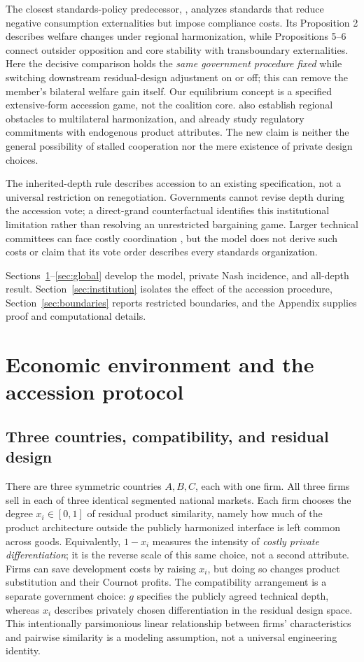 \documentclass[11pt,a4paper]{article}
\theoremstyle{remark}\newtheorem{remark}[theorem]{Remark}
\begin{document}
The closest standards-policy predecessor, \citet{Takarada2020}, analyzes standards that reduce negative consumption externalities but impose compliance costs. Its Proposition 2 describes welfare changes under regional harmonization, while Propositions 5--6 connect outsider opposition and core stability with transboundary externalities. Here the decisive comparison holds the \emph{same government procedure fixed} while switching downstream residual-design adjustment on or off; this can remove the member's bilateral welfare gain itself. Our equilibrium concept is a specified extensive-form accession game, not the coalition core. \citet{Kawabata2021} also establish regional obstacles to multilateral harmonization, and \citet{Grossman2021} already study regulatory commitments with endogenous product attributes. The new claim is neither the general possibility of stalled cooperation nor the mere existence of private design choices.

The inherited-depth rule describes accession to an existing specification, not a universal restriction on renegotiation. Governments cannot revise depth during the accession vote; a direct-grand counterfactual identifies this institutional limitation rather than resolving an unrestricted bargaining game. Larger technical committees can face costly coordination \citep{Simcoe2012}, but the model does not derive such costs or claim that its vote order describes every standards organization.

Sections~\ref{sec:model}--\ref{sec:global} develop the model, private Nash incidence, and all-depth result. Section~\ref{sec:institution} isolates the effect of the accession procedure, Section~\ref{sec:boundaries} reports restricted boundaries, and the Appendix supplies proof and computational details.

\section{Economic environment and the accession protocol}\label{sec:model}
\subsection{Three countries, compatibility, and residual design}
There are three symmetric countries $A,B,C$, each with one firm. All three firms sell in each of three identical segmented national markets. Each firm chooses the degree $x_i\in[0,1]$ of residual product similarity, namely how much of the product architecture outside the publicly harmonized interface is left common across goods. Equivalently, $1-x_i$ measures the intensity of \emph{costly private differentiation}; it is the reverse scale of this same choice, not a second attribute. Firms can save development costs by raising $x_i$, but doing so changes product substitution and their Cournot profits. The compatibility arrangement is a separate government choice: $g$ specifies the publicly agreed technical depth, whereas $x_i$ describes privately chosen differentiation in the residual design space. This intentionally parsimonious linear relationship between firms' characteristics and pairwise similarity is a modeling assumption, not a universal engineering identity.
\end{document}
